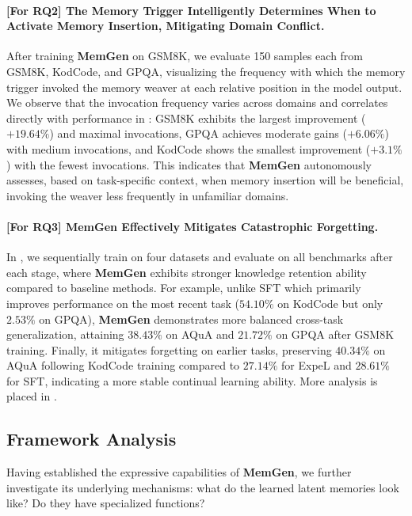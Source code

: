 \documentclass[]{fairmeta}
\newcommand{\ourmethod}{{\fontfamily{lmtt}\selectfont \textbf{MemGen}}\xspace}
\begin{document}
\paragraph{[For RQ2] The Memory Trigger Intelligently Determines When to Activate Memory Insertion, Mitigating Domain Conflict.} After training \ourmethod on GSM8K, we evaluate 150 samples each from GSM8K, KodCode, and GPQA, visualizing the frequency with which the memory trigger invoked the memory weaver at each relative position in the model output. We observe that the invocation frequency varies across domains and correlates directly with performance in : GSM8K exhibits the largest improvement ($+19.64\%$) and maximal invocations, GPQA achieves moderate gains ($+6.06\%$) with medium invocations, and KodCode shows the smallest improvement ($+3.1\%$) with the fewest invocations. This indicates that \ourmethod autonomously assesses, based on task-specific context, when memory insertion will be beneficial, invoking the weaver less frequently in unfamiliar domains. 

\vspace{-1em}
\paragraph{[For RQ3] \ourmethod Effectively Mitigates Catastrophic Forgetting.} 
In , we sequentially train on four datasets and evaluate on all benchmarks after each stage, where \ourmethod exhibits stronger knowledge retention ability compared to baseline methods. For example, unlike SFT which primarily improves performance on the most recent task ($54.10\%$ on KodCode but only $2.53\%$ on GPQA), \ourmethod demonstrates more balanced cross-task generalization, attaining $38.43\%$ on AQuA and $21.72\%$ on GPQA after GSM8K training. Finally, it mitigates forgetting on earlier tasks, preserving $40.34\%$ on AQuA following KodCode training compared to $27.14\%$ for ExpeL and $28.61\%$ for SFT, indicating a more stable continual learning ability. More analysis is placed in .

\vspace{-0.4em}
\subsection{Framework Analysis}
\vspace{-0.2em}
Having established the expressive capabilities of \ourmethod, we further investigate its underlying mechanisms: what do the learned latent memories look like? Do they have specialized functions?
\end{document}
